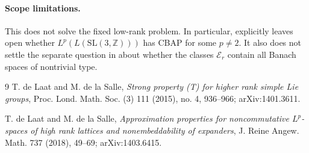 \documentclass[11pt]{article}
\begin{document}
\paragraph{Scope limitations.}
This does not solve the fixed low-rank problem.  In particular, \cite{dLdlS2014}
explicitly leaves open whether \(L^p(L(\mathrm{SL}(3,\mathbb Z)))\) has CBAP
for some \(p\neq 2\).  It also does not settle the separate question in
\cite{dLdlS2015} about whether the classes \(\mathcal E_r\) contain all Banach
spaces of nontrivial type.

\begin{thebibliography}{9}
T. de Laat and M. de la Salle,
\emph{Strong property (T) for higher rank simple Lie groups},
Proc. Lond. Math. Soc. (3) 111 (2015), no. 4, 936--966;
arXiv:1401.3611.

T. de Laat and M. de la Salle,
\emph{Approximation properties for noncommutative \(L^p\)-spaces of high rank
lattices and nonembeddability of expanders},
J. Reine Angew. Math. 737 (2018), 49--69;
arXiv:1403.6415.
\end{thebibliography}
\end{document}
